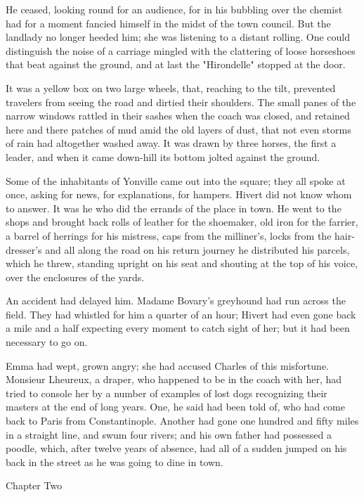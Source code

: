 \documentclass{tufte-book}
\begin{document}
He ceased, looking round for an audience, for in his bubbling over
the chemist had for a moment fancied himself in the midst of the town
council. But the landlady no longer heeded him; she was listening to a
distant rolling. One could distinguish the noise of a carriage mingled
with the clattering of loose horseshoes that beat against the ground,
and at last the "Hirondelle" stopped at the door.

It was a yellow box on two large wheels, that, reaching to the tilt,
prevented travelers from seeing the road and dirtied their shoulders.
The small panes of the narrow windows rattled in their sashes when the
coach was closed, and retained here and there patches of mud amid the
old layers of dust, that not even storms of rain had altogether washed
away. It was drawn by three horses, the first a leader, and when it came
down-hill its bottom jolted against the ground.

Some of the inhabitants of Yonville came out into the square; they all
spoke at once, asking for news, for explanations, for hampers. Hivert
did not know whom to answer. It was he who did the errands of the place
in town. He went to the shops and brought back rolls of leather for
the shoemaker, old iron for the farrier, a barrel of herrings for his
mistress, caps from the milliner's, locks from the hair-dresser's and
all along the road on his return journey he distributed his parcels,
which he threw, standing upright on his seat and shouting at the top of
his voice, over the enclosures of the yards.

An accident had delayed him. Madame Bovary's greyhound had run across
the field. They had whistled for him a quarter of an hour; Hivert had
even gone back a mile and a half expecting every moment to catch sight
of her; but it had been necessary to go on.

Emma had wept, grown angry; she had accused Charles of this misfortune.
Monsieur Lheureux, a draper, who happened to be in the coach with
her, had tried to console her by a number of examples of lost dogs
recognizing their masters at the end of long years. One, he said had
been told of, who had come back to Paris from Constantinople. Another
had gone one hundred and fifty miles in a straight line, and swum four
rivers; and his own father had possessed a poodle, which, after twelve
years of absence, had all of a sudden jumped on his back in the street
as he was going to dine in town.



Chapter Two
\end{document}
